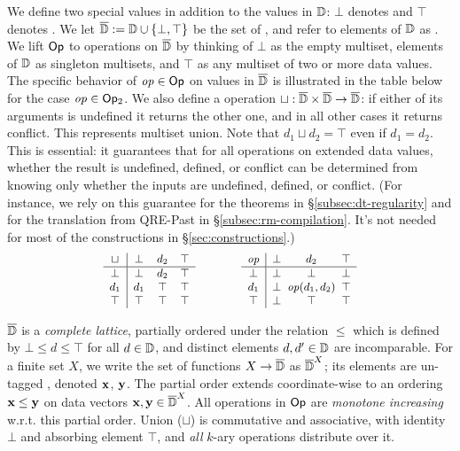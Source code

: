 We define two special values in addition to
the values in $\mathbb{D}$: $\bot$ denotes 
and $\top$ denotes .
We let $\overline{\mathbb{D}{}} := \mathbb{D} \cup \{\bot, \top\}$ be the set of ,
and refer to elements of $\mathbb{D}$ as .
We lift $\textsf{Op}$ to operations on $\overline{\mathbb{D}{}}$ by thinking of $\bot$ as the empty multiset,
elements of $\mathbb{D}$ as singleton multisets, and $\top$ as any multiset of two or more data values.
The specific behavior of $\mathit{op} \in \textsf{Op}$ on values in $\overline{\mathbb{D}{}}$
is illustrated in the table below
for the case $\mathit{op} \in \textsf{Op}{}_2$.
We also define a  operation $\sqcup: \overline{\mathbb{D}{}} \times \overline{\mathbb{D}{}} \to \overline{\mathbb{D}{}}$:
if either of its arguments is undefined it returns the other one,
and in all other cases it returns conflict.
This represents multiset union. Note that $d_1 \sqcup d_2 = \top$ even if $d_1 = d_2$.
This is essential: it guarantees that for all operations on extended data values, whether the result is undefined, defined, or conflict can be determined from knowing only whether the inputs are undefined, defined, or conflict.
(For instance, we rely on this guarantee for the theorems in \S\ref{subsec:dt-regularity} and for the translation from QRE-Past in \S\ref{subsec:rm-compilation}. It's not needed for most of the constructions in \S\ref{sec:constructions}.)
\[
\small
\begin{array}{c|ccc}
\sqcup & \bot & d_2 & \top \\
\hline
\bot & \bot & d_2 & \top \\
d_1 & d_1 & \top & \top \\
\top & \top & \top & \top
\end{array}
\qquad \qquad
\begin{array}{c|ccc}
\mathit{op} & \bot & d_2 & \top \\
\hline
\bot & \bot & \bot & \bot \\
d_1 & \bot & \hspace{-5pt}\mathit{op}(d_1,d_2)\hspace{-5pt} & \top \\
\top & \bot & \top & \top
\end{array}
\]

$\overline{\mathbb{D}{}}$ is a \emph{complete lattice}, partially ordered under the
relation $\le$ which is defined by $\bot \le d \le \top$ for all $d \in \mathbb{D}$,
and distinct elements $d, d' \in \mathbb{D}$ are incomparable.
For a finite set $X$, we write the set of functions $X \to \overline{\mathbb{D}{}}$ as $\overline{\mathbb{D}{}}^X$; its elements are un-tagged , denoted $\textbf{x}$, $\textbf{y}$.
The partial order extends coordinate-wise to an ordering $\textbf{x} \le \textbf{y}$ on data vectors $\textbf{x}, \textbf{y} \in \overline{\mathbb{D}{}}^X$.
All operations in $\textsf{Op}{}$ are \emph{monotone increasing}
w.r.t. this partial order.
Union ($\sqcup$) is commutative and associative, with identity $\bot$ and absorbing element $\top$,
and \emph{all} $k$-ary operations distribute over it.

